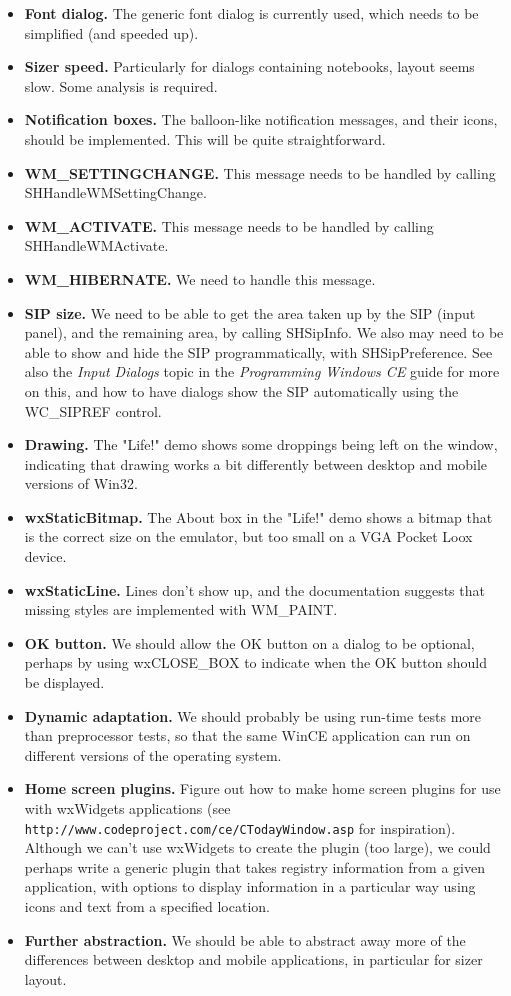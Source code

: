 \itemsep=0pt
\begin{itemize}
\item {\bf Font dialog.} The generic font dialog is currently used, which
needs to be simplified (and speeded up).
\item {\bf Sizer speed.} Particularly for dialogs containing notebooks,
layout seems slow. Some analysis is required.
\item {\bf Notification boxes.} The balloon-like notification messages, and their
icons, should be implemented. This will be quite straightforward.
\item {\bf WM\_SETTINGCHANGE.} This message needs to be handled by calling SHHandleWMSettingChange.
\item {\bf WM\_ACTIVATE.} This message needs to be handled by calling SHHandleWMActivate.
\item {\bf WM\_HIBERNATE.} We need to handle this message.
\item {\bf SIP size.} We need to be able to get the area taken up by the SIP (input panel),
and the remaining area, by calling SHSipInfo. We also may need to be able to show and hide
the SIP programmatically, with SHSipPreference. See also the {\it Input Dialogs} topic in
the {\it Programming Windows CE} guide for more on this, and how to have dialogs
show the SIP automatically using the WC_SIPREF control.
\item {\bf Drawing.} The "Life!" demo shows some droppings being left on the window,
indicating that drawing works a bit differently between desktop and mobile versions of
Win32.
\item {\bf wxStaticBitmap.} The About box in the "Life!" demo shows a bitmap that is
the correct size on the emulator, but too small on a VGA Pocket Loox device.
\item {\bf wxStaticLine.} Lines don't show up, and the documentation suggests that
missing styles are implemented with WM\_PAINT.
\item {\bf OK button.} We should allow the OK button on a dialog to be optional, perhaps
by using wxCLOSE\_BOX to indicate when the OK button should be displayed.
\item {\bf Dynamic adaptation.} We should probably be using run-time tests more
than preprocessor tests, so that the same WinCE application can run on different
versions of the operating system.
\item {\bf Home screen plugins.} Figure out how to make home screen plugins for use with wxWidgets
applications (see {\tt http://www.codeproject.com/ce/CTodayWindow.asp} for inspiration).
Although we can't use wxWidgets to create the plugin (too large), we could perhaps write
a generic plugin that takes registry information from a given application, with
options to display information in a particular way using icons and text from
a specified location.
\item {\bf Further abstraction.} We should be able to abstract away more of the differences
between desktop and mobile applications, in particular for sizer layout.
\end{itemize}

